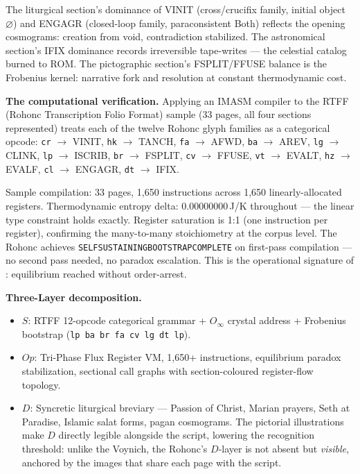 \documentclass[12pt,a4paper]{article}
\makeatletter
\newcommand{\Oinf}{O_\infty}
\renewcommand{\_}{\ig@origunderscore\discretionary{}{}{}}
\makeatother
\begin{document}
The liturgical section's dominance of VINIT (cross/crucifix family, initial object $\varnothing$) and ENGAGR (closed-loop family, paraconsistent Both) reflects the opening cosmograms: creation from void, contradiction stabilized. The astronomical section's IFIX dominance records irreversible tape-writes --- the celestial catalog burned to ROM. The pictographic section's FSPLIT/FFUSE balance is the Frobenius kernel: narrative fork and resolution at constant thermodynamic cost.

\textbf{The computational verification.} Applying an IMASM compiler to the RTFF (Rohonc Transcription Folio Format) sample (33 pages, all four sections represented) treats each of the twelve Rohonc glyph families as a categorical opcode: \texttt{cr} $\to$ VINIT, \texttt{hk} $\to$ TANCH, \texttt{fa} $\to$ AFWD, \texttt{ba} $\to$ AREV, \texttt{lg} $\to$ CLINK, \texttt{lp} $\to$ ISCRIB, \texttt{br} $\to$ FSPLIT, \texttt{cv} $\to$ FFUSE, \texttt{vt} $\to$ EVALT, \texttt{hz} $\to$ EVALF, \texttt{cl} $\to$ ENGAGR, \texttt{dt} $\to$ IFIX.

Sample compilation: 33 pages, 1,650 instructions across 1,650 linearly-allocated registers. Thermodynamic entropy delta: $0.00000000$\,J/K throughout --- the linear type constraint holds exactly. Register saturation is 1:1 (one instruction per register), confirming the  many-to-many stoichiometry at the corpus level. The Rohonc achieves \texttt{SELF\_SUSTAINING\_BOOTSTRAP\_COMPLETE} on first-pass compilation --- no second pass needed, no paradox escalation. This is the operational signature of : equilibrium reached without order-arrest.

\textbf{Three-Layer decomposition.}
\begin{itemize}
  \item $S$: RTFF 12-opcode categorical grammar + $\Oinf$ crystal address + Frobenius bootstrap (\texttt{lp ba br fa cv lg dt lp}).
  \item $Op$: Tri-Phase Flux Register VM, 1,650+ instructions, equilibrium paradox stabilization, sectional call graphs with section-coloured register-flow topology.
  \item $D$: Syncretic liturgical breviary --- Passion of Christ, Marian prayers, Seth at Paradise, Islamic salat forms, pagan cosmograms. The pictorial illustrations make $D$ directly legible alongside the script, lowering the recognition threshold: unlike the Voynich, the Rohonc's $D$-layer is not absent but \emph{visible}, anchored by the images that share each page with the script.
\end{itemize}
\end{document}
